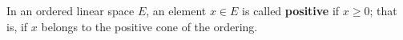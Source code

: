 In an ordered linear space $E$, an element $x \in E$ is called \textbf{positive} if $x \geq 0$; that is, if $x$ belongs to the positive cone of the ordering.
